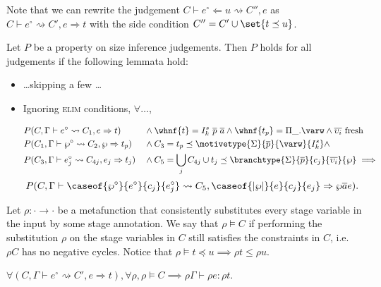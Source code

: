 \clearpage
\onecolumn

Note that we can rewrite the judgement $C \vdash e^\circ \Leftarrow u \rightsquigarrow C'', e$ as $C \vdash e^\circ \rightsquigarrow C', e \Rightarrow t$ with the side condition $C'' = C' \cup \set{t \preceq u}$.

\begin{proposition}
Let $P$ be a property on size inference judgements. Then $P$ holds for all judgements if the following lemmata hold: 
\begin{itemize}
    \item \ldots skipping a few \ldots
    \item Ignoring \textsc{elim} conditions, $\forall \dots$, 
        \begin{lemma}
        \begin{align*}
            &P(C, \Gamma \vdash e^\circ \rightsquigarrow C_1, e \Rightarrow t) &&\wedge \whnf{t} = I_k^s\ \overline{p}\ \overline{a} \wedge \whnf{t_p} = \Pi \_. \varw \wedge \overline{\upsilon_i}\ \text{fresh} \\
            &P(C_1, \Gamma \vdash \wp^\circ \rightsquigarrow C_2, \wp \Rightarrow t_p) &&\wedge C_3 = t_p \preceq \motivetype{\Sigma}{\overline{p}}{\varw}{I_k^s} \wedge \\
            &P(C_3, \Gamma \vdash e^\circ_j \rightsquigarrow C_{4j}, e_j \Rightarrow t_j) &&\wedge C_5 = \bigcup_j C_{4j} \cup t_j \preceq \branchtype{\Sigma}{\overline{p}}{c_j}{\overline{\upsilon_i}}{\wp} \implies
        \end{align*}
        $$P(C, \Gamma \vdash \caseof{\wp^\circ}{e^\circ}{c_j}{e_j^\circ} \rightsquigarrow C_5, \caseof{|\wp|}{e}{c_j}{e_j} \Rightarrow \wp \overline{a} e).$$
        \end{lemma}
\end{itemize}
\end{proposition}

Let $\rho : \cdot \to \cdot$ be a metafunction that consistently substitutes every stage variable in the input by some stage annotation. We say that $\rho \vDash C$ if performing the substitution $\rho$ on the stage variables in $C$ still satisfies the constraints in $C$, i.e. $\rho C$ has no negative cycles. Notice that $\rho \vDash t \preceq u \implies \rho t \leq \rho u$.

\begin{lemma}
$\forall (C, \Gamma \vdash e^\circ \rightsquigarrow C', e \Rightarrow t), \forall \rho, \rho \vDash C \implies \rho \Gamma \vdash \rho e : \rho t$.
\end{lemma}

